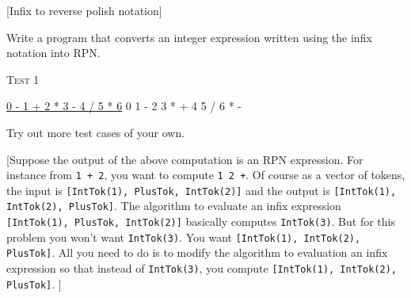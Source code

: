 [Infix to reverse polish notation]

Write a program that converts an integer expression written using the infix 
notation into RPN.

\textsc{Test 1}
\begin{console}[commandchars=\\\{\},fontsize=\footnotesize]
\underline{0 - 1 + 2 * 3 - 4 / 5 * 6}
0 1 - 2 3 * + 4 5 / 6 * - 
\end{console}

Try out more test cases of your own.

[Suppose the output of the above computation is an RPN expression.
For instance from \verb!1 + 2!, you want to compute \verb!1 2 +!.
Of course as a vector of tokens, the input is
\texttt{[IntTok(1), PlusTok, IntTok(2)]}
and the output is
\texttt{[IntTok(1), IntTok(2), PlusTok]}.
The algorithm to evaluate an infix expression
\texttt{[IntTok(1), PlusTok, IntTok(2)]}
basically computes \verb!IntTok(3)!.
But for this problem you won't want \verb!IntTok(3)!.
You want \texttt{[IntTok(1), IntTok(2), PlusTok]}.
All you need to do is to modify the algorithm to evaluation
an infix expression so that instead of
\verb!IntTok(3)!,
you compute \texttt{[IntTok(1), IntTok(2), PlusTok]}.
]
